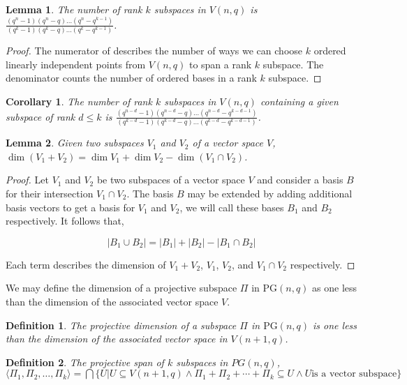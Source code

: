 \documentclass{article}
\newtheorem{lemma}{Lemma}
\newtheorem{corollary}{Corollary}
\newtheorem{definition}{Definition}
\newcommand{\PG}{\mathrm{PG}}
\begin{document}
\begin{lemma}\label{lemma:1}
  The number of rank \(k\) subspaces in \(V(n, q)\) is \(\frac{(q^n - 1)(q^n - q)\ldots (q^n - q^{k - 1})}{(q^k - 1)(q^k - q)\ldots (q^k - q^{k - 1})}\).
\end{lemma}
\begin{proof}
  The numerator of describes the number of ways we can choose \(k\) ordered linearly independent points from \(V(n, q)\) to span a rank \(k\) subspace. The denominator counts the number of ordered bases in a rank \(k\) subspace.
\end{proof}
\begin{corollary}
  The number of rank \(k\) subspaces in \(V(n, q)\) containing a given subspace of rank \(d \leq k\) is
  \(\frac{(q^{n - d} - 1)(q^{n - d} - q) \ldots (q^{n - d} - q^{k - d - 1})}{(q^{k - d} - 1) (q^{k - d} - q) \ldots (q^{k - d} - q^{k - d - 1})}\).
\end{corollary}

\begin{lemma}\label{lemma:2}
  Given two subspaces \(V_1\) and \(V_2\) of a vector space \(V\), \(\dim (V_1 + V_2) = \dim V_1 + \dim V_2 - \dim (V_1 \cap V_2)\).
\end{lemma}

\begin{proof}
  Let \(V_1\) and \(V_2\) be two subspaces of a vector space \(V\) and consider a basis \(B\) for their intersection \(V_1 \cap V_2\). The basis \(B\) may be extended by adding additional basis vectors to get a basis for \(V_1\) and \(V_2\), we will call these bases \(B_1\) and \(B_2\) respectively.
  It follows that,

  \begin{equation*}
    | B_1 \cup B_2 | = |B_1| + |B_2| - |B_1 \cap B_2|
  \end{equation*}

  Each term describes the dimension of \(V_1 + V_2\), \(V_1\), \(V_2\), and \(V_1 \cap V_2\) respectively.
\end{proof}

We may define the dimension of a projective subspace \(\Pi\) in \(\PG(n, q)\) as one less than the dimension of the associated vector space \(V\).
\begin{definition}
  The projective dimension of a subspace \(\Pi\) in \(\PG(n, q)\) is one less than the dimension of the associated vector space in \(V(n + 1, q)\).
\end{definition}

\begin{definition}\label{def:1}
  The projective span of \(k\) subspaces in \(PG(n, q)\), \(\langle \Pi_1, \Pi_2, \ldots, \Pi_k \rangle = \bigcap \{U  | U \subseteq V(n + 1, q) \land \Pi_1 + \Pi_2 + \cdots + \Pi_k \subseteq U \land U \text{is a vector subspace}\}\)
\end{definition}
\end{document}

